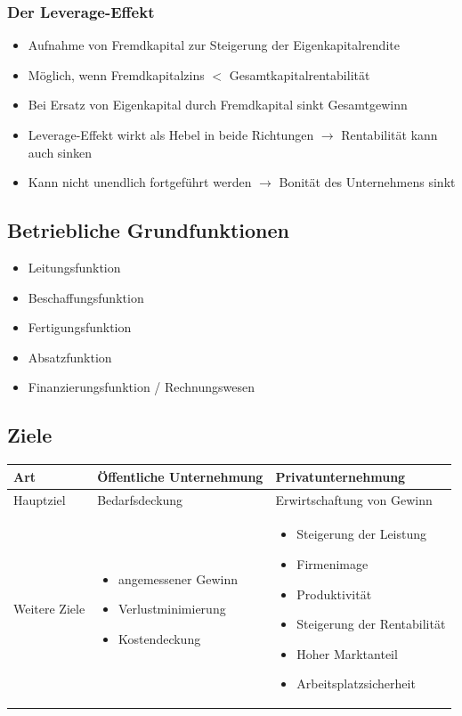 \documentclass[titlepage,parskip=half]{scrartcl}
\begin{document}
\subsubsection{Der Leverage-Effekt}
\begin{itemize}
    \item Aufnahme von Fremdkapital zur Steigerung der Eigenkapitalrendite
    \item Möglich, wenn Fremdkapitalzins $<$ Gesamtkapitalrentabilität
    \item Bei Ersatz von Eigenkapital durch Fremdkapital sinkt Gesamtgewinn
    \item Leverage-Effekt wirkt als Hebel in beide Richtungen $\rightarrow$ Rentabilität kann auch sinken
    \item Kann nicht unendlich fortgeführt werden $\rightarrow$ Bonität des Unternehmens sinkt
\end{itemize}

\subsection{Betriebliche Grundfunktionen}
\begin{itemize}
    \item Leitungsfunktion
    \item Beschaffungsfunktion
    \item Fertigungsfunktion
    \item Absatzfunktion
    \item Finanzierungsfunktion / Rechnungswesen
\end{itemize}

\subsection{Ziele}
\begin{tabularx}{\textwidth}{|l|X|X|} \hline
    Art & Öffentliche Unternehmung & Privatunternehmung \\ \hline
    Hauptziel & Bedarfsdeckung & Erwirtschaftung von Gewinn \\ \hline
Weitere Ziele & 
\begin{itemize}
    \item angemessener Gewinn
    \item Verlustminimierung
    \item Kostendeckung
\end{itemize}
    & 
    \begin{itemize}
        \item Steigerung der Leistung
        \item Firmenimage
        \item Produktivität
        \item Steigerung der Rentabilität
        \item Hoher Marktanteil
        \item Arbeitsplatzsicherheit
    \end{itemize}
    \\ \hline
\end{tabularx}
\end{document}
